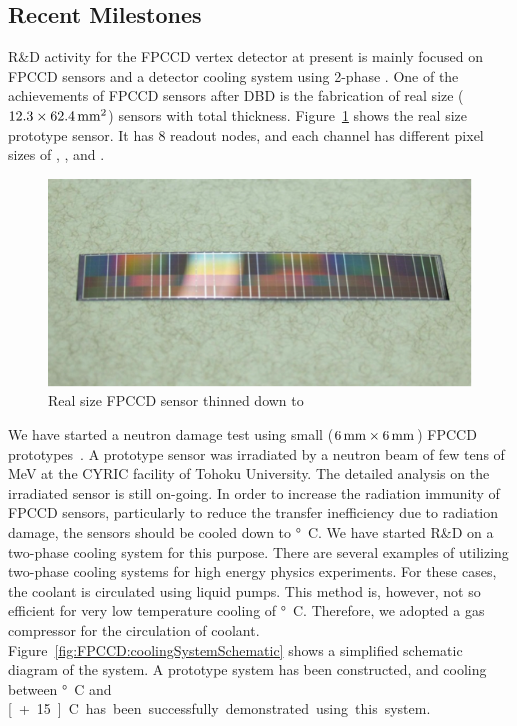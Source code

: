 \subsection{Recent Milestones}
R\&D activity for the FPCCD vertex detector at present is mainly focused on FPCCD sensors and a detector cooling system using 2-phase .  
One of the achievements of FPCCD sensors after DBD is the fabrication of real size ($12.3 \times \unit[62.4]{\mathrm{mm}^2}$) sensors with \unit[50]{\micron} total thickness. Figure~\ref{fig:FPCCD:realSizeSensor} shows the real size prototype sensor. It has 8 readout nodes, and each channel has different pixel sizes of \unit[12]{\micron}, \unit[8]{\micron}, and \unit[6]{\micron}.
\begin{figure}
    \includegraphics[width=\textwidth]{VertexDetector/FPCCD/realSizeFPCCDSensor.png}
    \caption{Real size FPCCD sensor thinned down to \unit[50]{\micron}}
    \label{fig:FPCCD:realSizeSensor}
\end{figure}
We have started a neutron damage test using small ($\unit[6]{mm}\times\unit[6]{mm}$) FPCCD prototypes~\cite{lcws:fpccd:ito:2013}. A prototype sensor was irradiated by a neutron beam of few tens of MeV at the CYRIC facility of Tohoku University. The detailed analysis on the irradiated sensor is still on-going.
In order to increase the radiation immunity of FPCCD sensors, particularly to reduce the transfer inefficiency due to radiation damage, the sensors should be cooled down to \unit[-40]{\degree C}. We have started R\&D on a two-phase  cooling system for this purpose. There are several examples of utilizing two-phase  cooling systems for high energy physics experiments. For these cases, the  coolant is circulated using liquid pumps. This method is, however, not so efficient for very low temperature cooling of \unit[-40]{\degree C}. Therefore, we adopted a  gas compressor for the circulation of  coolant. Figure~\ref{fig:FPCCD:coolingSystemSchematic} shows a simplified schematic diagram of the system. A prototype system has been constructed, and cooling between \unit[-40]{\degree C} and \unit[+15]{\degree C} has been successfully demonstrated using this system.

